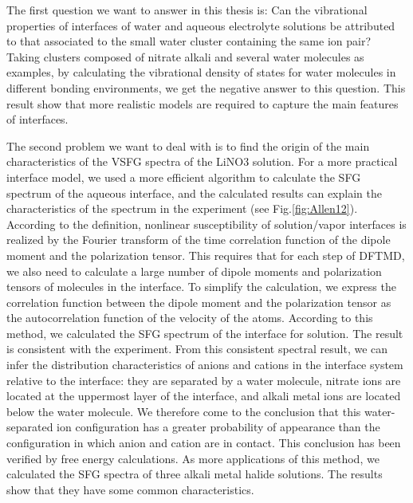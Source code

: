 The first question we want to answer in this thesis is: 
Can the vibrational properties of interfaces of water and aqueous electrolyte solutions be attributed to 
that associated to the small water cluster containing the same ion pair?　
Taking clusters composed of nitrate alkali and several water molecules as examples, by calculating the vibrational density of states 
for water molecules in different bonding environments, we get the negative answer to this question. 
This result show that more realistic models are required to capture the main features of interfaces.

The second problem we want to deal with is to find the origin of the main characteristics of the
VSFG spectra of the LiNO3 solution.
For a more practical interface model, we used a more efficient algorithm to calculate the SFG spectrum of the aqueous interface, 
and the calculated results can explain the characteristics of the spectrum in the experiment (see Fig.\ref{fig:Allen12}). 
According to the definition, nonlinear susceptibility of solution/vapor interfaces is realized by the Fourier transform of 
the time correlation function of the dipole moment and the polarization tensor. This requires that for each step of DFTMD, 
we also need to calculate a large number of dipole moments and polarization tensors of molecules in the interface. 
To simplify the calculation, we express the correlation function between the dipole moment and the polarization tensor 
as the autocorrelation function of the velocity of the atoms. According to this method, we calculated the SFG spectrum of the interface for \LiN solution. 
The result is consistent with the experiment. From this consistent spectral result, we can infer the distribution characteristics of anions 
and cations in the interface system relative to the interface: they are separated by a water molecule, nitrate ions are located at the uppermost layer of the interface, 
and alkali metal ions are located below the water molecule. We therefore come to the conclusion that this water-separated ion configuration 
has a greater probability of appearance than the configuration in which anion and cation are in contact.
This conclusion has been verified by free energy calculations. 
As more applications of this method, we calculated the SFG spectra of three alkali metal halide solutions. 
The results show that they have some common characteristics. 

